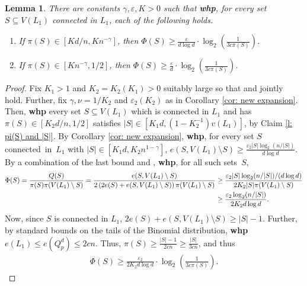 \documentclass[reqno,final,a4paper]{amsart}
\newtheorem{lemma}[thm]{Lemma}
\theoremstyle{definition}
\newcommand{\whp}{%
    \textbf{whp}
}
\def\eps{\varepsilon}
\newcommand{\1}{\mathbbm{1}}
\begin{document}
\begin{lemma}\label{l: bounding Phi(S)}
There are constants $\gamma,\eps,K>0$ such that \textbf{whp}, for every set $S\subseteq V(L_1)$ connected in $L_1$, each of the following holds.
\begin{enumerate}[label=\upshape(\alph*)]
    \item If $\pi(S)\in [Kd/n,K n^{-\gamma}]$, then $\Phi(S)\ge \frac{\eps}{d\log d}\cdot\log_2\left(\frac{1}{3c\pi(S)}\right)$. \label{phi small and medium}
    \item If $\pi(S)\in [K n^{-\gamma},1/2]$, then $\Phi(S)\ge \frac{\eps}{d}\cdot\log_2\left(\frac{1}{3c\pi(S)}\right)$. \label{phi large}
\end{enumerate}
\end{lemma}
\begin{proof}
Fix $K_1>1$ and $K_2=K_2(K_1)>0$ suitably large so that  and  jointly hold. Further, fix $\gamma,\nu=1/K_2$ and $\eps_2(K_2)$ as in Corollary \ref{cor: new expansion}.
Then, \whp every set $S\subseteq V(L_1)$ which is connected in $L_1$ and has $\pi(S)\in [K_2d/n,1/2]$ satisfies $|S|\in [K_1d, (1-K_2^{-1})v(L_1)]$, by Claim \ref{l: pi(S) and |S|}. 
By Corollary \ref{cor: new expansion}, \textbf{whp}, for every set $S$ connected~in~$L_1$ with $|S|\in [K_1d,K_2n^{1-\gamma}]$, $e(S,V(L_1)\setminus S)\ge \frac{\eps_2 |S|\log_2(n/|S|)}{d\log d}$. 
By a combination of the last bound and , \textbf{whp}, for all such sets~$S$,
\begin{align}
    \Phi(S)=\frac{Q(S)}{\pi(S)\pi(V(L_1)\setminus S)}=\frac{e(S,V(L_1)\setminus S)}{2\left(2e(S)+e(S,V(L_1)\setminus S)\right)\pi(V(L_1)\setminus S)}
    &\ge \frac{\eps_2 |S|\log_2(n/|S|)/(d\log d)}{2K_2 |S|\pi(V(L_1)\setminus S)}\notag\\
    &\ge \frac{\eps_2\log_2(n/|S|)}{2K_2d\log d}. \label{eq: PHI(S)}
\end{align}
Now, since $S$ is connected in $L_1$, $2e(S)+e(S,V(L_1)\setminus S)\ge |S|-1$. Further, by standard bounds on the tails of the Binomial distribution, \textbf{whp} $e(L_1)\le e(Q^d_p)\le 2cn$. Thus, $\pi(S)\ge \frac{|S|-1}{2cn}\ge \frac{|S|}{3cn}$, and thus
\begin{align*}
    \Phi(S)\ge\frac{\eps_2}{2K_2d\log d}\cdot \log_2\left(\frac{1}{3c\pi(S)}\right).
\end{align*}



\end{proof}
\end{document}
